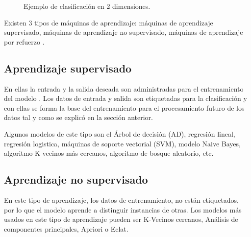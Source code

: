 \documentclass[twoside,spanish,ESP,MSc]{plantillaLabUPV}
\theoremstyle{definition}
\begin{document}
\begin{figure}  
\centering
{}
\caption{Ejemplo de clasificación en 2 dimensiones.}
\label{fig:clplot}  
\end{figure}



Existen 3 tipos de máquinas de aprendizaje: máquinas de aprendizaje supervisado, máquinas de aprendizaje no supervisado, máquinas de aprendizaje por refuerzo \cite{supervisadobook}.


\subsection{Aprendizaje supervisado}

En ellas la entrada y la salida deseada son administradas para el entrenamiento del modelo  \cite{classifs}. Los datos de entrada y salida son etiquetadas para la clasificación y con ellas se forma la base del entrenamiento para el procesamiento futuro de los datos tal y como se explicó en la sección anterior.

Algunos modelos de este tipo son el Árbol de decisión (AD), regresión lineal, regresión logistica, máquinas de soporte vectorial (SVM), modelo Naive Bayes, algoritmo K-vecinos más cercanos, algoritmo de bosque aleatorio, etc.


\subsection{Aprendizaje no supervisado}

En este tipo de aprendizaje, los datos de entrenamiento, no están etiquetados, por lo que el modelo aprende a distinguir instancias de otras. Los modelos más usados en este tipo de aprendizaje pueden ser K-Vecinos cercanos, Análisis de componentes principales, Apriori o Eclat.
\end{document}
